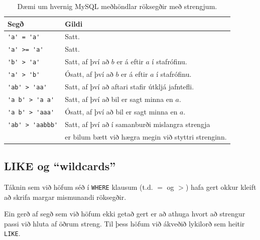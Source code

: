 \begin{table}
\centering
\caption[Röksegðir með strengjum]{Dæmi um hvernig MySQL meðhöndlar röksegðir með strengjum.}
\label{tafla:samanburdir-strengir}
\begin{tabular}{ll}
\toprule
Segð&Gildi\\
\midrule
\verb|'a' = 'a'|&Satt.\\
\verb|'a' >= 'a'|&Satt.\\
\verb|'b' > 'a'|&Satt, af því að $b$ er á eftir $a$ í stafrófinu.\\
\verb|'a' > 'b'|&Ósatt, af því að $b$ er á eftir $a$ í stafrófinu.\\
\verb|'ab' > 'aa'|&Satt, af því að aftari stafir útkljá jafntefli.\\
\verb|'a b' > 'a a'|&Satt, af því að bil er sagt minna en $a$.\\
\verb|'a b' > 'aaa'|&Ósatt, af því að bil er sagt minna en $a$.\\
\verb|'ab' > 'aabbb'|&Satt, af því að í samanburði mislangra strengja\\
&er bilum bætt við hægra megin við styttri strenginn.\\
\bottomrule
\end{tabular}
\end{table}

\begin{example}
\caption[Stærra-en samanburður við streng]{\emph{SELECT}-skipun sem ber saman öll nöfn við strenginn \emph{'M'}. Skipunin skilar nöfnum allra nemanda sem eru á eftir \emph{M} í stafrófinu, \emph{að nemendum sem byrja á M meðtöldum!} Þetta er vegna þess að strengurinn \emph{M} er lengdur með bilum áður en samanburðurinn er framkvæmdur. Bil er álitið ``minna'' en allir bókstafir, svo segðin verður sönn fyrir öll nöfn sem byrja á \emph{M}.}
\label{sql:k4d7-where-nafn-staerra-en}
\centering
{}
\end{example}

\subsection{LIKE og ``wildcards''}
Táknin sem við höfum séð í \verb|WHERE| klausum (t.d. $=$ og $>$) hafa gert okkur kleift að skrifa margar mismunandi röksegðir.

Ein gerð af segð sem við höfum ekki getað gert er að athuga hvort að strengur passi við hluta af öðrum streng. Til þess höfum við ákveðið lykilorð sem heitir \verb|LIKE|.


